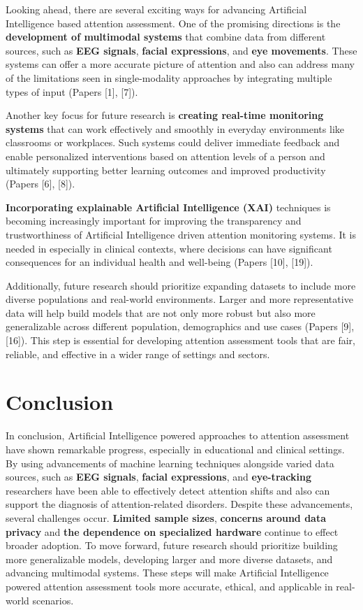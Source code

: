 \documentclass[12pt]{article}
\begin{document}
Looking ahead, there are several exciting ways for advancing Artificial Intelligence based attention assessment. One of the promising directions is the \textbf{development of multimodal systems} that combine data from different sources, such as \textbf{EEG signals}, \textbf{facial expressions}, and \textbf{eye movements}. These systems can offer a more accurate picture of attention and also can address many of the limitations seen in single-modality approaches by integrating multiple types of input (Papers [1], [7]).

Another key focus for future research is \textbf{creating real-time monitoring systems} that can work effectively and smoothly in everyday environments like classrooms or workplaces. Such systems could deliver immediate feedback and enable personalized interventions based on attention levels of a person and ultimately supporting better learning outcomes and improved productivity (Papers [6], [8]).

\textbf{Incorporating explainable Artificial Intelligence (XAI)} techniques is becoming increasingly important for improving the transparency and trustworthiness of Artificial Intelligence driven attention monitoring systems. It is needed in especially in clinical contexts, where decisions can have significant consequences for an individual health and well-being (Papers [10], [19]).

Additionally, future research should prioritize expanding datasets to include more diverse populations and real-world environments. Larger and more representative data will help build models that are not only more robust but also more generalizable across different population, demographics and use cases (Papers [9], [16]). This step is essential for developing attention assessment tools that are fair, reliable, and effective in a wider range of settings and sectors.

\section{Conclusion}
In conclusion, Artificial Intelligence powered approaches to attention assessment have shown remarkable progress, especially in educational and clinical settings. By using advancements of machine learning techniques alongside varied data sources, such as \textbf{EEG signals}, \textbf{facial expressions}, and \textbf{eye-tracking} researchers have been able to effectively detect attention shifts and also can support the diagnosis of attention-related disorders.
Despite these advancements, several challenges occur. \textbf{Limited sample sizes}, \textbf{concerns around data privacy} and \textbf{the dependence on specialized hardware} continue to effect broader adoption. To move forward, future research should prioritize building more generalizable models, developing larger and more diverse datasets, and advancing multimodal systems. These steps will make Artificial Intelligence powered attention assessment tools more accurate, ethical, and applicable in real-world scenarios.
\end{document}

